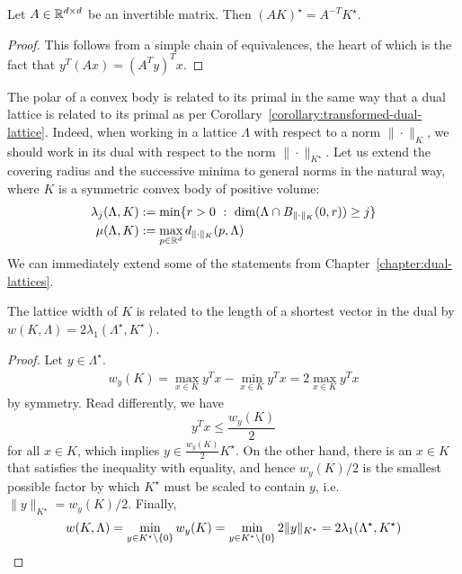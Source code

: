 \begin{lemma}
  Let $A \in \mathbb{R}^{d \times d}$ be an invertible matrix.
  Then $(A K)^\star = A^{-T} K^\star$.
\end{lemma}
\begin{proof}
  This follows from a simple chain of equivalences,
  the heart of which is the fact that $y^T(Ax) = (A^T y)^T x$.
\end{proof}

The polar of a convex body is related to its primal in the same way
that a dual lattice is related to its primal as per Corollary~\ref{corollary:transformed-dual-lattice}.
Indeed, when working in a lattice $\Lambda$ with respect to a norm $\|\cdot\|_K$,
we should work in its dual with respect to the norm $\|\cdot\|_{K^\star}$.
Let us extend the covering radius and the successive minima to general norms in the natural way,
where $K$ is a symmetric convex body of positive volume:
\begin{align*}
  \lambda_j(\Lambda, K) &:= \min\{ r > 0 ~:~ \dim( \Lambda \cap B_{\|\cdot\|_K}(0,r) ) \geq j \} \\
  \mu(\Lambda, K) &:= \max_{p \in \mathbb{R}^d} d_{\|\cdot\|_K}(p, \Lambda)
\end{align*}
We can immediately extend some of the statements from Chapter~\ref{chapter:dual-lattices}.
\begin{lemma}
  The lattice width of $K$ is related to the length of a shortest vector in the dual by
  $w(K,\Lambda) = 2\lambda_1(\Lambda^\star, K^\star)$.
\end{lemma}
\begin{proof}
  Let $y \in \Lambda^\star$.
  \begin{align*}
    w_y(K) = \max_{x \in K} y^Tx - \min_{x \in K} y^Tx = 2 \max_{x \in K} y^Tx
  \end{align*}
  by symmetry.
  Read differently, we have
  \[
    y^Tx \leq \frac{w_y(K)}{2}
  \]
  for all $x \in K$, which implies $y \in \frac{w_y(K)}{2} K^\star$.
  On the other hand, there is an $x \in K$ that satisfies the inequality with equality,
  and hence $w_y(K) / 2$ is the smallest possible factor by which $K^\star$ must be scaled to contain $y$,
  i.e. $\|y\|_{K^\star} = w_y(K) / 2$.
  Finally,
  \[
    w(K,\Lambda) = \min_{y\in K^\star\setminus \{0\} } w_y(K) = \min_{y\in K^\star\setminus \{0\} } 2 \|y\|_{K^\star}
      = 2 \lambda_1(\Lambda^\star, K^\star) \qedhere
  \]
\end{proof}

